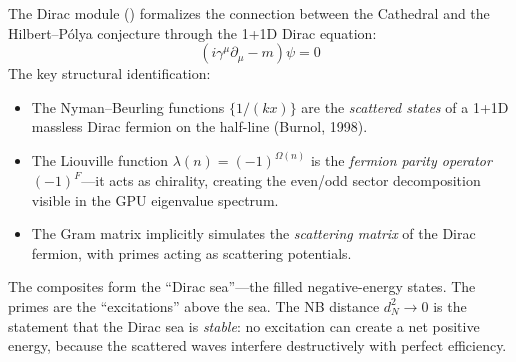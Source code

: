 The Dirac module () formalizes the connection
between the Cathedral and the Hilbert--P\'olya conjecture through
the 1+1D Dirac equation:
\begin{equation}
  (i\gamma^\mu \partial_\mu - m)\psi = 0
  \label{eq:dirac}
\end{equation}
The key structural identification:
\begin{itemize}
  \item The Nyman--Beurling functions $\{1/(kx)\}$ are the
    \emph{scattered states} of a 1+1D massless Dirac fermion
    on the half-line (Burnol, 1998).
  \item The Liouville function $\lambda(n) = (-1)^{\Omega(n)}$ is
    the \emph{fermion parity operator} $(-1)^F$---it acts as
    chirality, creating the even/odd sector decomposition
    visible in the GPU eigenvalue spectrum.
  \item The Gram matrix implicitly simulates the
    \emph{scattering matrix} of the Dirac fermion, with
    primes acting as scattering potentials.
\end{itemize}

\begin{principle}
The composites form the ``Dirac sea''---the filled negative-energy
states. The primes are the ``excitations'' above the sea. The
NB distance $d_N^2 \to 0$ is the statement that the Dirac sea
is \emph{stable}: no excitation can create a net positive energy,
because the scattered waves interfere destructively with perfect
efficiency.
\end{principle}
